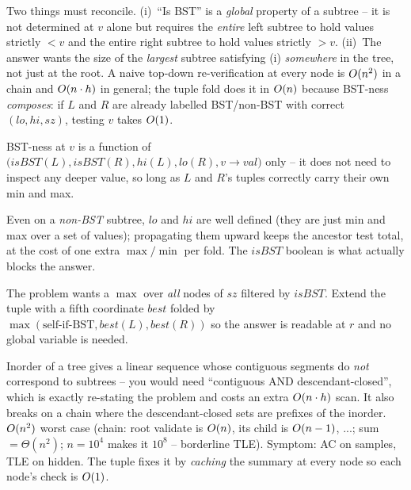 Two things must reconcile. (i)~``Is BST'' is a \emph{global} property of a
subtree -- it is not determined at $v$ alone but requires the \emph{entire}
left subtree to hold values strictly $<v$ and the entire right subtree to
hold values strictly $>v$. (ii)~The answer wants the size of the
\emph{largest} subtree satisfying (i) \emph{somewhere} in the tree, not just
at the root. A naive top-down re-verification at every node is $O(n^2)$
in a chain and $O(n\cdot h)$ in general; the tuple fold does it in
$O(n)$ because BST-ness \emph{composes}: if $L$ and $R$ are already
labelled BST/non-BST with correct $(\mathit{lo},\mathit{hi},\mathit{sz})$,
testing $v$ takes $O(1)$.

\begin{observation}
BST-ness at $v$ is a function of $\big(\mathit{isBST}(L),\mathit{isBST}(R),
\mathit{hi}(L),\mathit{lo}(R),v\!\to\!\mathit{val}\big)$ only -- it does not
need to inspect any deeper value, so long as $L$ and $R$'s tuples correctly
carry their own min and max.
\end{observation}
\begin{observation}
Even on a \emph{non-BST} subtree, $\mathit{lo}$ and $\mathit{hi}$ are well
defined (they are just min and max over a set of values); propagating them
upward keeps the ancestor test total, at the cost of one extra $\max/\min$
per fold. The $\mathit{isBST}$ boolean is what actually blocks the answer.
\end{observation}
\begin{observation}
The problem wants a $\max$ over \emph{all} nodes of $\mathit{sz}$ filtered by
$\mathit{isBST}$. Extend the tuple with a fifth coordinate $\mathit{best}$
folded by $\max(\text{self-if-BST}, \mathit{best}(L), \mathit{best}(R))$ so
the answer is readable at $r$ and no global variable is needed.
\end{observation}

\begin{thinkbox}
{Inorder of a tree gives a linear sequence whose contiguous segments do
\emph{not} correspond to subtrees -- you would need ``contiguous AND
descendant-closed'', which is exactly re-stating the problem and costs an
extra $O(n\cdot h)$ scan. It also breaks on a chain where the
descendant-closed sets are prefixes of the inorder.}
{$O(n^2)$ worst case (chain: root validate is $O(n)$, its child is
$O(n-1)$, ...; sum $=\Theta(n^2)$; $n=10^{4}$ makes it $10^{8}$ --
borderline TLE). Symptom: AC on samples, TLE on hidden. The tuple fixes it
by \emph{caching} the summary at every node so each node's check is $O(1)$.}
\end{thinkbox}

